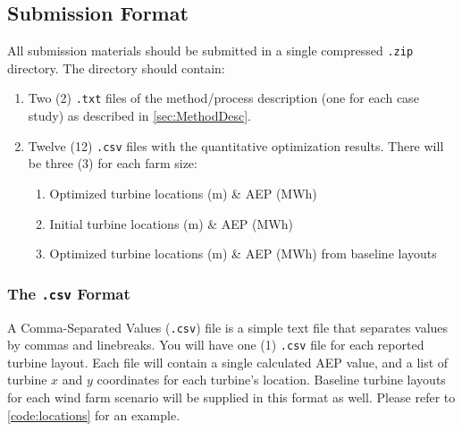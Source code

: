 \documentclass[12pt]{article}
\begin{document}
\subsection{Submission Format}
    All submission materials should be submitted in a single compressed \texttt{.zip} directory. The directory should contain:
    
    \begin{enumerate}
        \item Two (2) \texttt{.txt} files of the method/process description (one for each case study) as described in \cref{sec:MethodDesc}.
        \item Twelve (12) \texttt{.csv} files with the quantitative optimization results. There will be three (3) for each farm size:
        \begin{enumerate}[1)]
            \item Optimized turbine locations (m) \& AEP (MWh)
            \item Initial turbine locations (m) \& AEP (MWh)
            \item Optimized turbine locations (m) \& AEP (MWh) from baseline layouts
        \end{enumerate}
    \end{enumerate}
    
    \subsubsection{The \texttt{.csv} Format}
    \label{Sec:Csv}
    A Comma-Separated Values (\texttt{.csv}) file is a simple text file that separates values by commas and linebreaks. You will have one (1) \texttt{.csv} file for each reported turbine layout. Each file will contain a single calculated AEP value, and a list of turbine $x$ and $y$ coordinates for each turbine's location. Baseline turbine layouts for each wind farm scenario will be supplied in this format as well. Please refer to \cref{code:locations} for an example.
    
\end{document}
